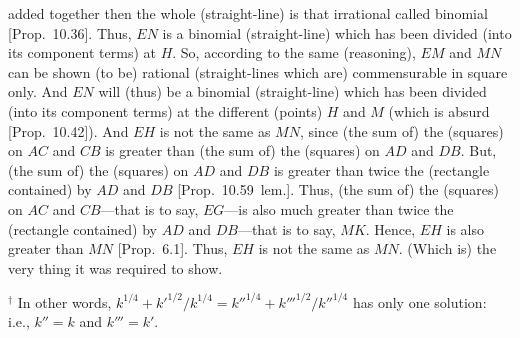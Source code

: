 \begin{Parallel}{}{}
{added together then the whole (straight-line) is that irrational called
binomial [Prop.~10.36]. Thus, $EN$
is a binomial (straight-line) which has been divided (into its component terms) at $H$. So, according to
the same (reasoning), $EM$ and $MN$ can be shown (to be) rational
(straight-lines which are) commensurable in square only. And $EN$
will (thus) be a binomial (straight-line) which has been divided (into its component terms) at the different (points)
$H$ and $M$ (which is absurd [Prop.~10.42]).
And $EH$ is not the same as $MN$, since (the sum of) the
(squares) on $AC$ and $CB$ is greater than (the sum of) the (squares) on
$AD$ and $DB$. But, (the sum of) the (squares) on $AD$ and $DB$
is greater than twice the (rectangle contained) by $AD$ and $DB$ [Prop.~10.59~lem.]. Thus,  (the sum of) the (squares) on $AC$ and $CB$---that is to say, $EG$---is also much greater than twice the (rectangle contained) by 
$AD$ and $DB$---that is to say, $MK$. Hence, $EH$ is also greater
than $MN$ [Prop.~6.1]. Thus, $EH$ is not the same as $MN$. (Which is) the very thing
it was required to show.}
\end{Parallel}
{\footnotesize\noindent$^\dag$ In other words, $k^{1/4}+k'^{1/2}/k^{1/4}
= k''^{1/4}+k'''^{1/2}/k''^{1/4}$
has only one solution: {i.e.}, $k''=k$ and $k'''=k'$.}

